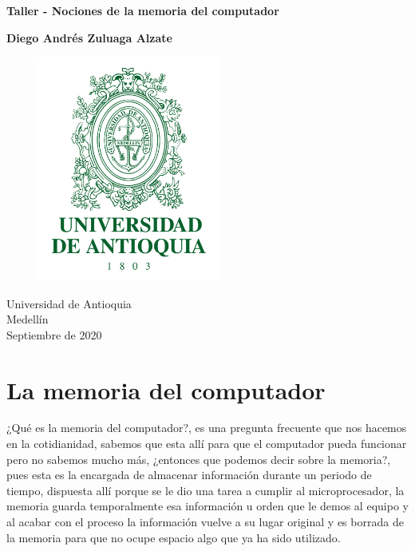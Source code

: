 \documentclass{article}
\begin{document}
\begin{titlepage}
    \begin{center}
        \vspace*{1cm}
            
        \Huge
        \textbf{Taller - Nociones de la memoria del computador}
            
        \vspace{1.5cm}
        
        \textbf{Diego Andrés Zuluaga Alzate}
        
        \vspace{1.5cm}
        
        \begin{figure}[h]
        \includegraphics[width=6cm]{logoudea.png}
        \centering
        \label{fig:logoudea}
        \end{figure}
            
        \vspace{0.7cm}
            
        \Large
        Universidad de Antioquia\\
        Medellín\\
        Septiembre de 2020
            
    \end{center}
\end{titlepage}

\tableofcontents

\break

\section{La memoria del computador}
¿Qué es la memoria del computador?, es una pregunta frecuente que nos hacemos en la cotidianidad, sabemos que esta allí para que el computador pueda funcionar pero no sabemos mucho más, ¿entonces que podemos decir sobre la memoria?, pues esta es la encargada de almacenar información durante un periodo de tiempo, dispuesta allí porque se le dio una tarea a cumplir al microprocesador, la memoria guarda temporalmente esa información u orden que le demos al equipo y al acabar con el proceso  la información vuelve a su lugar original  y es borrada de la memoria para que no ocupe espacio algo que ya ha sido utilizado.\cite{memoria}
 
\end{document}
